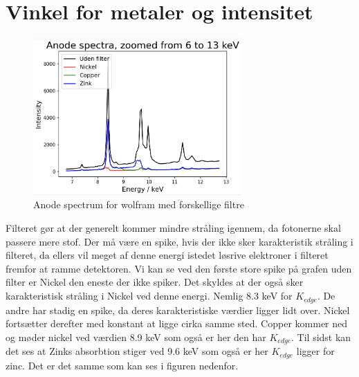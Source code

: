 \documentclass[a4paper,twoside]{article}
\begin{document}
\section{Vinkel for metaler og intensitet}
\begin{figure}[H]
\begin{centering}
\includegraphics[height=6cm]{Anode spectra.png}
\hspace{1cm}
\par\end{centering}
\caption{\label{cap:2ien} Anode spectrum for wolfram med forskellige filtre }
\end{figure}
Filteret gør at der generelt kommer mindre stråling igennem, da  fotonerne skal passere mere stof. Der må være en spike, hvis der ikke sker karakteristik stråling i filteret, da ellers vil meget af denne energi istedet løsrive elektroner i filteret fremfor at ramme detektoren. Vi kan se ved den første store spike på grafen uden filter er Nickel den eneste der ikke spiker. Det skyldes at der også sker karakteristisk stråling i Nickel ved denne energi. Nemlig 8.3 keV for $K_{edge}$. De andre har stadig en spike, da deres karakteristiske værdier ligger lidt over. Nickel fortsætter derefter med konstant at ligge cirka samme sted. Copper kommer ned og møder nickel ved værdien 8.9 keV som også er her den har $K_{edge}$. Til sidst kan det ses at Zinks absorbtion stiger ved 9.6 keV som også er her $K_{edge}$ ligger for zinc. Det er det samme som kan ses i figuren nedenfor. 
\end{document}
